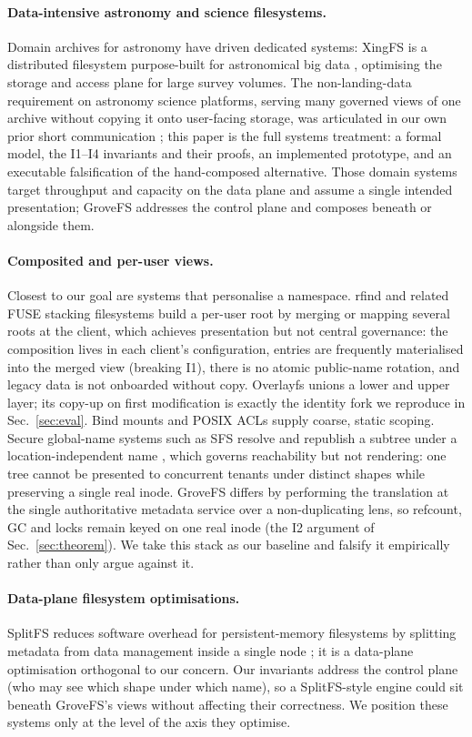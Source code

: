\documentclass[numberedsection,acmtos]{acmart}
\begin{document}
\paragraph{Data-intensive astronomy and science filesystems.}
Domain archives for astronomy have driven dedicated systems: XingFS is a
distributed filesystem purpose-built for astronomical big data \citep{xingfs},
optimising the storage and access plane for large survey volumes. The
non-landing-data requirement on astronomy science platforms, serving many
governed views of one archive without copying it onto user-facing
storage, was articulated in our own prior short communication \citep{han2026yourfs};
this paper is the full systems treatment: a formal model, the I1--I4 invariants
and their proofs, an implemented prototype, and an executable falsification of
the hand-composed alternative. Those domain systems target throughput and capacity on
the data plane and assume a single intended presentation; GroveFS addresses the
control plane and composes beneath or alongside them.

\paragraph{Composited and per-user views.}
Closest to our goal are systems that personalise a namespace. rfind \citep{rfind}
and related FUSE stacking filesystems build a per-user root by merging or mapping
several roots at the client, which achieves presentation but not central
governance: the composition lives in each client's configuration, entries are
frequently materialised into the merged view (breaking I1), there is no atomic
public-name rotation, and legacy data is not onboarded without copy. Overlayfs
unions a lower and upper layer; its copy-up on first modification is exactly the
identity fork we reproduce in Sec.~\ref{sec:eval}. Bind mounts and POSIX ACLs
supply coarse, static scoping. Secure global-name systems such as SFS resolve
and republish a subtree under a location-independent name \citep{sfs}, which
governs reachability but not rendering: one tree cannot be presented
to concurrent tenants under distinct shapes while preserving a single real inode.
GroveFS differs by performing the translation at
the single authoritative metadata service over a non-duplicating lens, so
refcount, GC and locks remain keyed on one real inode (the I2 argument of
Sec.~\ref{sec:theorem}). We take this stack as our baseline and falsify it empirically
rather than only argue against it.

\paragraph{Data-plane filesystem optimisations.}
SplitFS reduces software overhead for persistent-memory filesystems by splitting
metadata from data management inside a single node \citep{splitfs}; it is a
data-plane optimisation orthogonal to our concern. Our invariants address the
control plane (who may see which shape under which name), so a
SplitFS-style engine could sit beneath GroveFS's views without affecting their
correctness. We position these systems only at the level of the axis they optimise.
\end{document}
